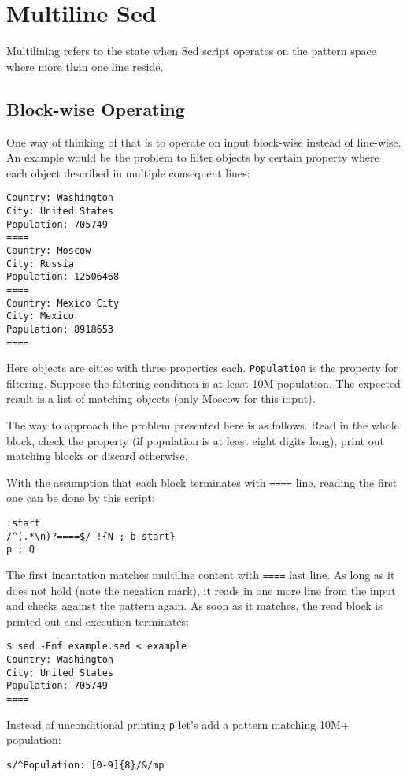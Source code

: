 \chapter{Multiline Sed}
Multilining refers to the state when Sed script operates on the pattern space
where more than one line reside.
\section{Block-wise Operating}
One way of thinking of that is to operate on input block-wise instead of line-wise.
An example would be the problem to filter objects by certain property
where each object described in multiple consequent lines:
\begin{lstlisting}
Country: Washington
City: United States
Population: 705749
====
Country: Moscow
City: Russia
Population: 12506468
====
Country: Mexico City
City: Mexico
Population: 8918653
====
\end{lstlisting}

Here objects are cities with three properties each.
\lstinline{Population} is the property for filtering.
Suppose the filtering condition is at least 10M population.
The expected result is a list of matching objects (only Moscow for this input).

The way to approach the problem presented here is as follows.
Read in the whole block, check the property (if population is
at least eight digits long),
print out matching blocks or discard otherwise.

With the assumption that each block terminates with \lstinline{====} line,
reading the first one can be done by this script:
\begin{lstlisting}
:start
/^(.*\n)?====$/ !{N ; b start}
p ; Q
\end{lstlisting}

The first incantation matches multiline content with \lstinline{====} last line.
As long as it does not hold (note the negation mark), it reads in one more line
from the input and checks against the pattern again. As soon as it matches,
the read block is printed out and execution terminates:
\begin{lstlisting}
$ sed -Enf example.sed < example
Country: Washington
City: United States
Population: 705749
====
\end{lstlisting}

Instead of unconditional printing \lstinline{p} let's add a pattern
matching 10M+ population:
\begin{lstlisting}
s/^Population: [0-9]{8}/&/mp
\end{lstlisting}

